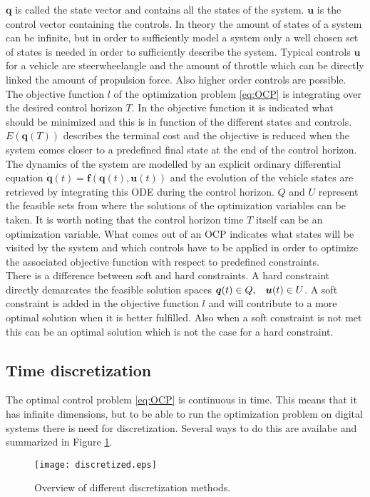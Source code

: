 $\bm{q}$ is called the state vector and contains all the states of the system. $\bm{u}$ is the control vector containing the controls. In theory the amount of states of a system can be infinite, but in order to sufficiently model a system only a well chosen set of states is needed in order to sufficiently describe the system. Typical controls $\bm{u}$ for a vehicle are steerwheelangle and the amount of throttle which can be directly linked the amount of propulsion force. Also higher order controls are possible.\\
The objective function $l$ of the optimization problem \ref{eq:OCP} is integrating over the desired control horizon $T$. In the objective function it is indicated what should be minimized and this is in function of the different states and controls. $E(\bm{q}(T))$ describes the terminal cost and the objective is reduced when the system comes closer to a predefined final state at the end of the control horizon.
The dynamics of the system are modelled by an explicit ordinary differential equation $\bm{\dot{q}}(t) = \bm{f}(\bm{q}(t), \bm{u}(t))$ and the evolution of the vehicle states are retrieved by integrating this ODE during the control horizon.
$Q$ and $U$ represent the feasible sets from where the solutions of the optimization variables can be taken. It is worth noting that the control horizon time $T$ itself can be an optimization variable. What comes out of an OCP indicates what states will be visited by the system and which controls have to be applied in order to optimize the associated objective function with respect to predefined constraints. \cite{Panos_opti}\\ 

There is a difference between soft and hard constraints. A hard constraint directly demarcates the feasible solution spaces $\bm{q}(t)\in Q,\hspace{3 mm} \bm{u}(t)\in U$. A soft constraint is added in the objective function $l$ and will contribute to a more optimal solution when it is better fulfilled. Also when a soft constraint is not met this can be an optimal solution which is not the case for a hard constraint. \cite{Yankov} \\

\subsection{Time discretization}
\label{s:time_dis}
The optimal control problem \ref{eq:OCP} is continuous in time. This means that it has infinite dimensions, but to be able to run the optimization problem on digital systems there is need for discretization. Several ways to do this are availabe and summarized in Figure \ref{fig:discretization_m}.\cite{Gillis2019}
\begin{figure}[htp]
	\centering
	\texttt{[image: discretized.eps]}
	\caption{Overview of different discretization methods.}
	\label{fig:discretization_m}
\end{figure}

